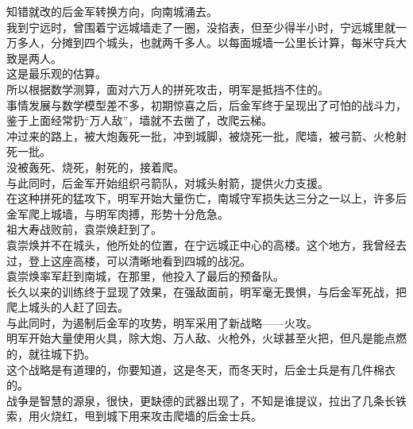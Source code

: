 \begin{multicols}{\theparacolNo}
知错就改的后金军转换方向，向南城涌去。\\

我到宁远时，曾围着宁远城墙走了一圈，没掐表，但至少得半小时，宁远城里就一万多人，分摊到四个城头，也就两千多人。以每面城墙一公里长计算，每米守兵大致是两人。\\

这是最乐观的估算。\\

所以根据数学测算，面对六万人的拼死攻击，明军是抵挡不住的。\\

事情发展与数学模型差不多，初期惊喜之后，后金军终于呈现出了可怕的战斗力，鉴于上面经常扔“万人敌”，墙就不去凿了，改爬云梯。\\

冲过来的路上，被大炮轰死一批，冲到城脚，被烧死一批，爬墙，被弓箭、火枪射死一批。\\

没被轰死、烧死，射死的，接着爬。\\

与此同时，后金军开始组织弓箭队，对城头射箭，提供火力支援。\\

在这种拼死的猛攻下，明军开始大量伤亡，南城守军损失达三分之一以上，许多后金军爬上城墙，与明军肉搏，形势十分危急。\\

祖大寿战败前，袁崇焕赶到了。\\

袁崇焕并不在城头，他所处的位置，在宁远城正中心的高楼。这个地方，我曾经去过，登上这座高楼，可以清晰地看到四城的战况。\\

袁崇焕率军赶到南城，在那里，他投入了最后的预备队。\\

长久以来的训练终于显现了效果，在强敌面前，明军毫无畏惧，与后金军死战，把爬上城头的人赶了回去。\\

与此同时，为遏制后金军的攻势，明军采用了新战略——火攻。\\

明军开始大量使用火具，除大炮、万人敌、火枪外，火球甚至火把，但凡是能点燃的，就往城下扔。\\

这个战略是有道理的，你要知道，这是冬天，而冬天时，后金士兵是有几件棉衣的。\\

战争是智慧的源泉，很快，更缺德的武器出现了，不知是谁提议，拉出了几条长铁索，用火烧红，甩到城下用来攻击爬墙的后金士兵。\\


\end{multicols}
